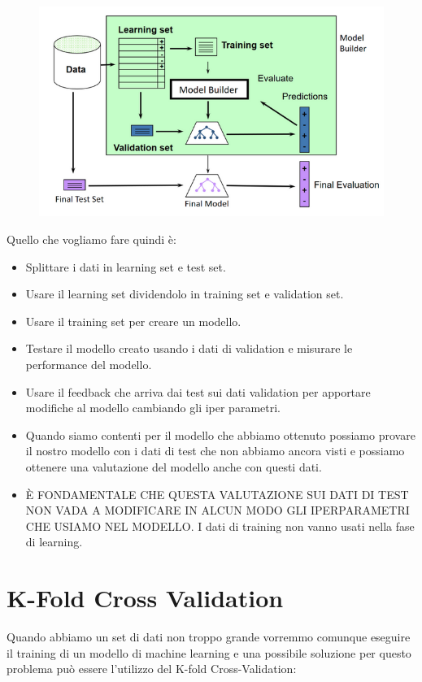 \documentclass[14pt]{extreport}
\begin{document}
\begin{figure}[H]
	\centering
	\includegraphics[width=0.7\linewidth]{593.jpeg}
\end{figure}


Quello che vogliamo fare quindi è:
\begin{itemize}
	\item Splittare i dati in learning set e test set.
	\item Usare il learning set dividendolo in training set e validation set.
	\item Usare il training set per creare un modello.
	\item Testare il modello creato usando i dati di validation e misurare le performance del modello.
	\item Usare il feedback che arriva dai test sui dati validation per apportare modifiche al modello cambiando gli iper parametri.
	\item Quando siamo contenti per il modello che abbiamo ottenuto possiamo provare il nostro modello con i dati di test che non abbiamo ancora visti
	e possiamo ottenere una valutazione del modello anche con questi dati.
	\item È FONDAMENTALE CHE QUESTA VALUTAZIONE SUI DATI DI TEST NON VADA A MODIFICARE IN ALCUN MODO GLI IPERPARAMETRI CHE USIAMO NEL MODELLO. I dati
	di training non vanno usati nella fase di learning.
\end{itemize}

\section{K-Fold Cross Validation}

Quando abbiamo un set di dati non troppo grande vorremmo comunque eseguire il training di un modello di machine learning e una possibile soluzione per
questo problema può essere l’utilizzo del K-fold Cross-Validation:
\end{document}
